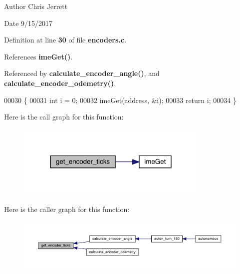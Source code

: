 \begin{DoxyAuthor}{Author}
Chris Jerrett 
\end{DoxyAuthor}
\begin{DoxyDate}{Date}
9/15/2017 
\end{DoxyDate}


Definition at line \textbf{ 30} of file \textbf{ encoders.\+c}.



References \textbf{ ime\+Get()}.



Referenced by \textbf{ calculate\+\_\+encoder\+\_\+angle()}, and \textbf{ calculate\+\_\+encoder\+\_\+odemetry()}.


\begin{DoxyCode}
00030                                              \{
00031   \textcolor{keywordtype}{int} i = 0;
00032   imeGet(address, &i);
00033   \textcolor{keywordflow}{return} i;
00034 \}
\end{DoxyCode}
Here is the call graph for this function\+:
\nopagebreak
\begin{figure}[H]
\begin{center}
\leavevmode
\includegraphics[width=261pt]{encoders_8c_aed261dd4dae33a48c42f2e363c84760f_cgraph}
\end{center}
\end{figure}
Here is the caller graph for this function\+:
\nopagebreak
\begin{figure}[H]
\begin{center}
\leavevmode
\includegraphics[width=350pt]{encoders_8c_aed261dd4dae33a48c42f2e363c84760f_icgraph}
\end{center}
\end{figure}
\mbox{\label{encoders_8c_a8e6b77703c5cf18e00709b052fb4bf22}} 
